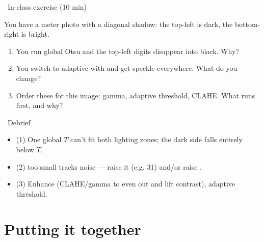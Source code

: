 \documentclass[10pt,aspectratio=169]{beamer}
\begin{document}
\begin{frame}{\faPen~In-class exercise (10 min)}
  \begin{infobox}
  \end{infobox}
  You have a meter photo with a diagonal shadow: the top-left is dark, the bottom-right is bright.
  \begin{enumerate}
    \item You run global Otsu and the top-left digits disappear into black. Why?
    \item You switch to adaptive with  and get speckle everywhere. What do you change?
    \item Order these for this image: gamma, adaptive threshold, CLAHE. What runs first, and why?
  \end{enumerate}
\end{frame}

\begin{frame}{\faPen~Debrief}
  \begin{itemize}
    \item (1) One global $T$ can't fit both lighting zones; the dark side falls entirely below $T$.
    \item (2)  too small tracks noise — raise it (e.g. 31) and/or raise .
    \item (3) Enhance  (CLAHE/gamma to even out and lift contrast),  adaptive threshold.
  \end{itemize}
\end{frame}

\section{Putting it together}
\end{document}
